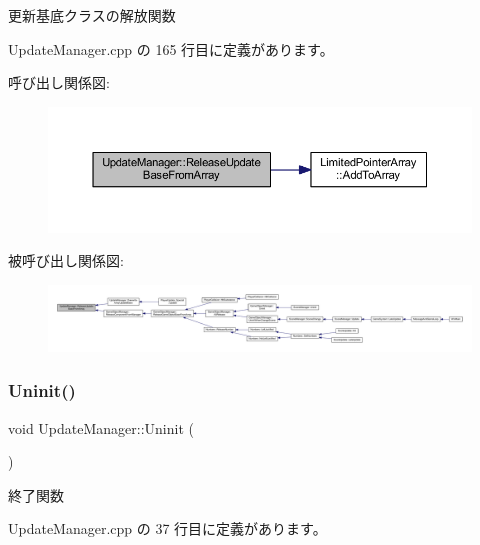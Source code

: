 更新基底クラスの解放関数 



 Update\+Manager.\+cpp の 165 行目に定義があります。

呼び出し関係図\+:
\nopagebreak
\begin{figure}[H]
\begin{center}
\leavevmode
\includegraphics[width=350pt]{class_update_manager_a8a54226896f4280b589af85c07e869d9_cgraph}
\end{center}
\end{figure}
被呼び出し関係図\+:
\nopagebreak
\begin{figure}[H]
\begin{center}
\leavevmode
\includegraphics[width=350pt]{class_update_manager_a8a54226896f4280b589af85c07e869d9_icgraph}
\end{center}
\end{figure}
\mbox{\label{class_update_manager_a389f9047e882de587eb4def0c691909d}} 
\subsubsection{\texorpdfstring{Uninit()}{Uninit()}}
{\footnotesize\ttfamily void Update\+Manager\+::\+Uninit (\begin{DoxyParamCaption}{ }\end{DoxyParamCaption})}



終了関数 



 Update\+Manager.\+cpp の 37 行目に定義があります。

